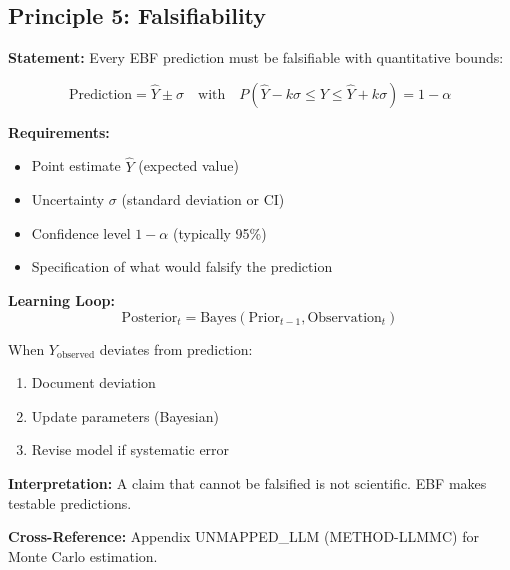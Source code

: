 \subsection{Principle 5: Falsifiability}

\begin{tcolorbox}[colback=gray!5!white, colframe=gray!75!black,
    title=Axiom UNMAPPED_PR-5: Falsifiable Predictions]

\textbf{Statement:} Every EBF prediction must be falsifiable with quantitative bounds:

\begin{equation}
\text{Prediction} = \hat{Y} \pm \sigma \quad \text{with} \quad P(\hat{Y} - k\sigma \leq Y \leq \hat{Y} + k\sigma) = 1 - \alpha
\end{equation}

\textbf{Requirements:}
\begin{itemize}[nosep]
    \item Point estimate $\hat{Y}$ (expected value)
    \item Uncertainty $\sigma$ (standard deviation or CI)
    \item Confidence level $1 - \alpha$ (typically 95\%)
    \item Specification of what would falsify the prediction
\end{itemize}

\textbf{Learning Loop:}
\begin{equation}
\text{Posterior}_t = \text{Bayes}(\text{Prior}_{t-1}, \text{Observation}_t)
\end{equation}

When $Y_{\text{observed}}$ deviates from prediction:
\begin{enumerate}
    \item Document deviation
    \item Update parameters (Bayesian)
    \item Revise model if systematic error
\end{enumerate}

\textbf{Interpretation:} A claim that cannot be falsified is not scientific. EBF makes testable predictions.

\textbf{Cross-Reference:} Appendix UNMAPPED_LLM (METHOD-LLMMC) for Monte Carlo estimation.

\end{tcolorbox}



